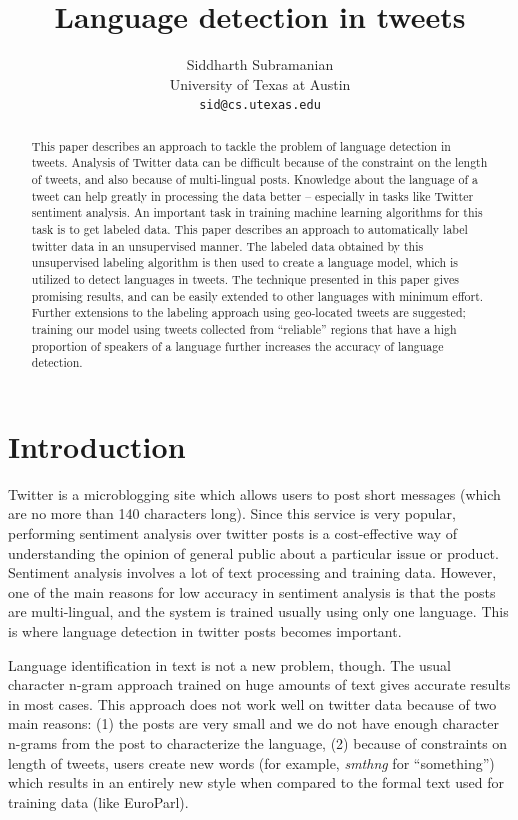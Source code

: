 \documentclass[11pt]{article}
\title{Language detection in tweets}
\author{Siddharth Subramanian \\
  University of Texas at Austin\\
  {\tt sid@cs.utexas.edu} \\}
\date{}
\begin{document}
\maketitle
\begin{abstract}
This paper describes an approach to tackle the problem of language detection in tweets. Analysis of Twitter data can be difficult because of the constraint on the length of tweets, and also because of multi-lingual posts. Knowledge about the language of a tweet can help greatly in processing the data better -- especially in tasks like Twitter sentiment analysis. An important task in training machine learning algorithms for this task is to get labeled data. This paper describes an approach to automatically label twitter data in an unsupervised manner. The labeled data obtained by this unsupervised labeling algorithm is then used to create a language model, which is utilized to detect languages in tweets. The technique presented in this paper gives promising results, and can be easily extended to other languages with minimum effort. Further extensions to the labeling approach using geo-located tweets are suggested; training our model using tweets collected from ``reliable'' regions that have a high proportion of speakers of a language further increases the accuracy of language detection.
\end{abstract}

\section{Introduction}
Twitter is a microblogging site which allows users to post short messages (which are no more than 140 characters long). Since this service is very popular, performing sentiment analysis over twitter posts is a cost-effective way of understanding the opinion of general public about a particular issue or product. Sentiment analysis involves a lot of text processing and training data. However, one of the main reasons for low accuracy in sentiment analysis is that the posts are multi-lingual, and the system is trained usually using only one language. This is where language detection in twitter posts becomes important.

Language identification in text is not a new problem, though. The usual character n-gram approach trained on huge amounts of text gives accurate results in most cases. This approach does not work well on twitter data because of two main reasons: (1) the posts are very small and we do not have enough character n-grams from the post to characterize the language, (2) because of constraints on length of tweets, users create new words (for example, {\em smthng} for ``something'') which results in an entirely new style when compared to the formal text used for training data (like EuroParl).
\end{document}
